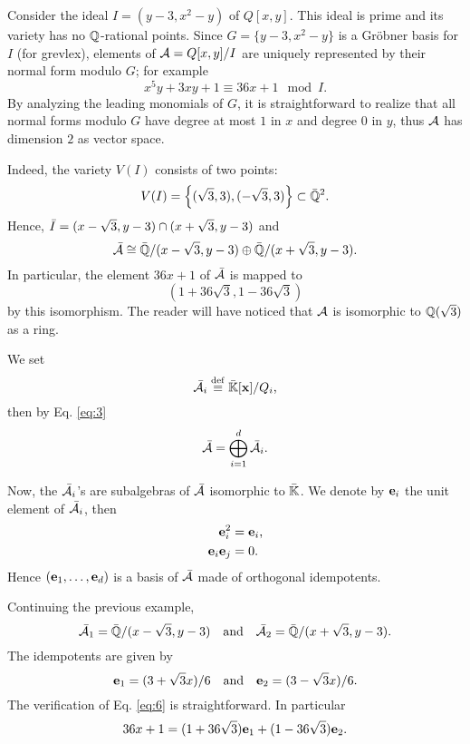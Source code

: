 \begin{example}
  Consider the ideal $I=(y-3,x^2-y)$ of $Q[x,y]$. This ideal is prime
  and its variety has no $\mathbb{Q}$-rational points. Since $G=\{y-3,x^2-y\}$
  is a Gröbner basis for $I$ (for grevlex), elements of
  $\mathcal{A}=Q[x,y]/I$ are uniquely represented by their normal form
  modulo $G$; for example
  \[x^5y + 3xy + 1 \equiv 36x + 1 \mod I\text{.}\] By analyzing the
  leading monomials of $G$, it is straightforward to realize that all
  normal forms modulo $G$ have degree at most $1$ in $x$ and degree
  $0$ in $y$, thus $\mathcal{A}$ has dimension $2$ as vector space.

  Indeed, the variety $V(I)$ consists of two points:
  \[V(I)=\left\{(\sqrt{3},3), (-\sqrt{3},3)\right\}\subset\bar{\mathbb{Q}}^2\text{.}\]
  Hence, $\bar{I}=(x-\sqrt{3},y-3)\cap(x+\sqrt{3},y-3)$ and
  \[\bar{\mathcal{A}}\cong \bar{\mathbb{Q}}/(x-\sqrt{3},y-3) \oplus
  \bar{\mathbb{Q}}/(x+\sqrt{3},y-3)\text{.}\] In particular, the element
  $36x+1$ of $\bar{\mathcal{A}}$ is mapped to
  \[(1+36\sqrt{3},1-36\sqrt{3})\] by this isomorphism. The reader will
  have noticed that $\mathcal{A}$ is isomorphic to $\mathbb{Q}(\sqrt{3})$ as a ring.
\end{example}

We set 
\begin{equation}
  \label{eq:4}
  \bar{\mathcal{A}}_i\overset{\mathrm{def}}{\equiv} \bar{\mathbb{K}}[\mathbf{x}]/Q_i
  \text{,}
\end{equation}
then by Eq. \eqref{eq:3} 
\begin{equation}
  \label{eq:5}
  \bar{\mathcal{A}} = \bigoplus_{i=1}^d\bar{\mathcal{A}_i}
  \text{.}
\end{equation}

Now, the $\bar{\mathcal{A}}_i$'s are subalgebras of $\bar{\mathcal{A}}$
isomorphic to $\bar{\mathbb{K}}$. We denote by $\mathbf{e}_i$ the unit element
of $\bar{\mathcal{A}}_i$, then
\begin{equation}
  \label{eq:6}
  \begin{aligned}
    \mathbf{e}_i^2 &= \mathbf{e}_i\text{,}\\
    \mathbf{e}_i\mathbf{e}_j &= 0\text{.}
  \end{aligned}
\end{equation}
Hence $(\mathbf{e}_1,\ldots,\mathbf{e}_d)$ is a basis of
$\bar{\mathcal{A}}$ made of orthogonal idempotents.

\begin{example}
  \label{ex:trace}
  Continuing the previous example, 
  \[\bar{\mathcal{A}}_1 = \bar{\mathbb{Q}}/(x-\sqrt{3},y-3)
  \quad\text{and}\quad
  \bar{\mathcal{A}}_2 = \bar{\mathbb{Q}}/(x+\sqrt{3},y-3)
  \text{.}\]
  The idempotents are given by
  \[\mathbf{e}_1 = (3+\sqrt{3}x)/6
  \quad\text{and}\quad \mathbf{e}_2 = (3-\sqrt{3}x)/6 \text{.}\] The
  verification of Eq. \eqref{eq:6} is straightforward. In particular
  \[36x + 1 = (1+36\sqrt{3})\mathbf{e}_1 + (1-36\sqrt{3})\mathbf{e}_2
  \text{.}\]
\end{example}

